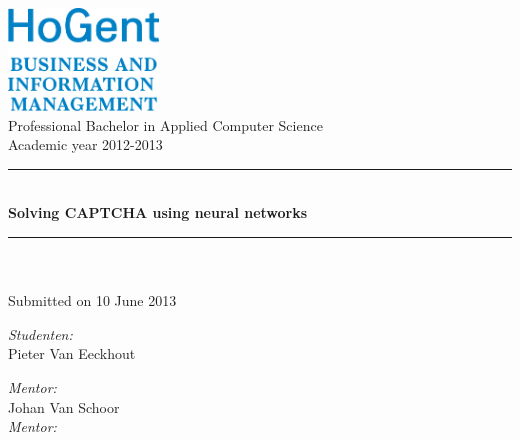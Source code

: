 \documentclass[pdftex,a4paper,12pt,twoside]{report}
\newcommand{\HRule}{\rule{\linewidth}{0.5mm}}
\newcommand{\captchasp}{CAPTCHA }
\newcommand{\studenta}{Pieter {Van Eeckhout}}
\newcommand{\begeleider}{Johan {Van Schoor}}
\newcommand{\titel}{Solving \captchasp using neural networks}
\newcommand{\ondertitel}{}
\newcommand{\datum}{10 June 2013}
\newcommand{\academiejaar}{2012-2013}
\begin{document}

\begin{titlepage}
\begin{center}
\includegraphics[width=4cm]{./img/FBO-EN.png}\\[.5cm]




Professional Bachelor in Applied Computer Science\\
Academic year \academiejaar

\vfill

\HRule \\[0.4cm]
{ \huge \bfseries \titel}\\[0.4cm]
\HRule \\[0.4cm]

{\Large \ondertitel}\\[0.4cm]

Submitted on \datum

\vfill

\begin{minipage}{0.49\textwidth}
\begin{flushleft}
\emph{Student\ifdefined\studentb en\fi :}\\
\studenta \\
\ifdefined\studentb \studentb \fi\par
\end{flushleft}
\end{minipage}
\begin{minipage}{0.49\textwidth}
\begin{flushright}
\emph{Mentor:}\\ \begeleider\\
\ifdefined\mentor \emph{Mentor:}\\ \mentor \fi
\end{flushright}
\end{minipage}

\end{center}

\end{titlepage}

\end{document}
